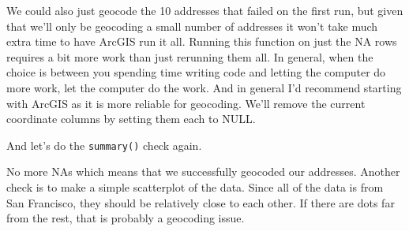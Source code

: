 \documentclass[
]{krantz}
\makeatletter
\newenvironment{Shaded}{\begin{snugshade}}{\end{snugshade}}
\newcommand{\AttributeTok}[1]{\textcolor[rgb]{0.61,0.61,0.61}{#1}}
\newcommand{\CommentTok}[1]{\textcolor[rgb]{0.37,0.37,0.37}{\textit{#1}}}
\newcommand{\ConstantTok}[1]{\textcolor[rgb]{0,0,0}{#1}}
\newcommand{\FunctionTok}[1]{\textcolor[rgb]{0,0,0}{#1}}
\newcommand{\NormalTok}[1]{#1}
\newcommand{\OtherTok}[1]{\textcolor[rgb]{0.37,0.37,0.37}{#1}}
\newcommand{\SpecialCharTok}[1]{\textcolor[rgb]{0,0,0}{#1}}
\newcommand{\StringTok}[1]{\textcolor[rgb]{0.5,0.5,0.5}{#1}}
\newenvironment{kframe}{%
\medskip{}
\setlength{\fboxsep}{.8em}
 \def\at@end@of@kframe{}%
 \ifinner\ifhmode%
  \def\at@end@of@kframe{\end{minipage}}%
  \begin{minipage}{\columnwidth}%
 \fi\fi%
 \def\FrameCommand##1{\hskip\@totalleftmargin \hskip-\fboxsep
 \colorbox{shadecolor}{##1}\hskip-\fboxsep
     \hskip-\linewidth \hskip-\@totalleftmargin \hskip\columnwidth}%
 \MakeFramed {\advance\hsize-\width
   \@totalleftmargin\z@ \linewidth\hsize
   \@setminipage}}%
 {\par\unskip\endMakeFramed%
 \at@end@of@kframe}
\renewenvironment{Shaded}{\begin{kframe}}{\end{kframe}}
\makeatother
\begin{document}
We could also just geocode the 10 addresses that failed on
the first run, but given that we'll only be geocoding a
small number of addresses it won't take much extra time to
have ArcGIS run it all. Running this function on just the NA
rows requires a bit more work than just rerunning them all.
In general, when the choice is between you spending time
writing code and letting the computer do more work, let the
computer do the work. And in general I'd recommend starting
with ArcGIS as it is more reliable for geocoding. We'll
remove the current coordinate columns by setting them each
to NULL.

\begin{Shaded}
\end{Shaded}

And let's do the \texttt{summary()} check again.

\begin{Shaded}
\end{Shaded}

\begin{Shaded}
\end{Shaded}

No more NAs which means that we successfully geocoded our
addresses. Another check is to make a simple scatterplot of
the data. Since all of the data is from San Francisco, they
should be relatively close to each other. If there are dots
far from the rest, that is probably a geocoding issue.
\end{document}
